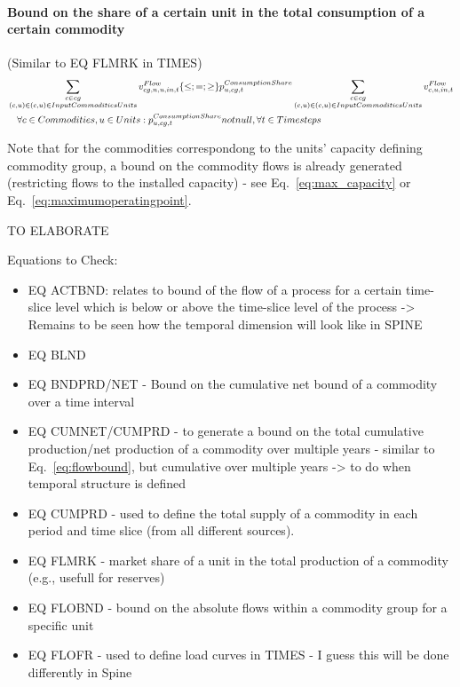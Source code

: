 \paragraph{Bound on the share of a certain unit in the total consumption of a certain commodity}
(Similar to EQ FLMRK in TIMES)
\begin{align} \label{eq:consumptionshare}
&\sum_{\substack{\commodity \in cg \\ (\commodity,\unit) \in \InputCommoditiesUnits}} \vFlow[cg,\node,\unit,in,\timestep] \{\le;=;\ge\} \pConsumptionShare \sum_{\substack{\commodity \in cg \\ (\commodity,\unit) \in \InputCommoditiesUnits}} \vFlow[\commodity,\unit,in,\timestep] \nonumber \\
&\quad \forall \commodities, \units : \pConsumptionShare not null, \forall \timesteps
\end{align}


Note that for the commodities correspondong to the units' capacity defining commodity group, a bound on the commodity flows is already generated (restricting flows to the installed capacity) - see Eq.~\eqref{eq:max_capacity} or Eq.~\eqref{eq:maximumoperatingpoint}.

{\color{red} TO ELABORATE

Equations to Check:
\begin{itemize}
	\item EQ ACTBND: relates to bound of the flow of a process for a certain time-slice level which is below or above the time-slice level of the process -> Remains to be seen how the temporal dimension will look like in SPINE
	\item EQ BLND
	\item EQ BNDPRD/NET - Bound on the cumulative net bound of a commodity over a time interval
	\item EQ CUMNET/CUMPRD - to generate a bound on the total cumulative production/net production of a commodity over multiple years - similar to Eq.~\eqref{eq:flowbound}, but cumulative over multiple years -> to do when temporal structure is defined
	\item EQ CUMPRD - used to define the total supply of a commodity in each period and time slice (from all different sources).
	\item EQ FLMRK - market share of a unit in the total production of a commodity (e.g., usefull for reserves)
	\item EQ FLOBND - bound on the absolute flows within a commodity group for a specific unit
	\item EQ FLOFR - used to define load curves in TIMES - I guess this will be done differently in Spine
\end{itemize}
}


